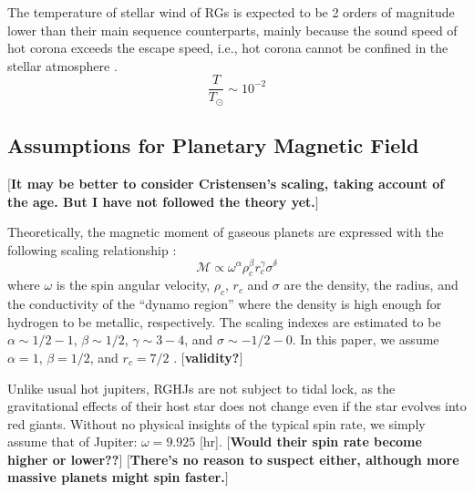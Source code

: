 \documentclass{emulateapj}
\def\memoYF#1{\color{red}$[${\bf #1}$]$ \color{black}}
\def\memoDS#1{\color{blue}$[${\bf #1}$]$ \color{black}}
\begin{document}
The temperature of stellar wind of RGs is expected to be 2 orders of magnitude lower than their main sequence counterparts, mainly because the sound speed of hot corona exceeds the escape speed, i.e., hot corona cannot be confined in the stellar atmosphere \citep{suzuki2008}. 
\begin{equation}
\frac{T}{T_{\odot}} \sim 10^{-2}
\end{equation}

\subsection{Assumptions for Planetary Magnetic Field}
\label{ss:magneticfield}

\memoYF{It may be better to consider Cristensen's scaling, taking account of the age. But I have not followed the theory yet.}

Theoretically, the magnetic moment of gaseous planets are expressed with the following scaling relationship \citep{griebmeier2004}:
\begin{equation}
\mathcal{M} \propto  \omega ^{\alpha } \rho_c ^{\beta } r_c^{\gamma } \sigma ^{\delta }
\end{equation}
where $\omega $ is the spin angular velocity, $\rho _c$, $r_c$ and $\sigma $ are the density, the radius, and the conductivity of the ``dynamo region'' where the density is high enough for hydrogen to be metallic, respectively. 
The scaling indexes are estimated to be $\alpha \sim 1/2-1$, $\beta \sim 1/2$, $\gamma \sim 3-4$, and $\sigma \sim -1/2-0$. In this paper, we assume $\alpha =1$, $\beta =1/2$, and $r_c = 7/2$ \citep{sano1993}. \memoYF{validity?}

Unlike usual hot jupiters, RGHJs are not subject to tidal lock, as the gravitational effects of their host star does not change even if the star evolves into red giants. Without no physical insights of the typical spin rate, we simply assume that of Jupiter: $\omega = 9.925$ [hr]. 
\memoYF{Would their spin rate become higher or lower??}
\memoDS{There's no reason to suspect either, although more massive planets might spin faster.}
\end{document}
